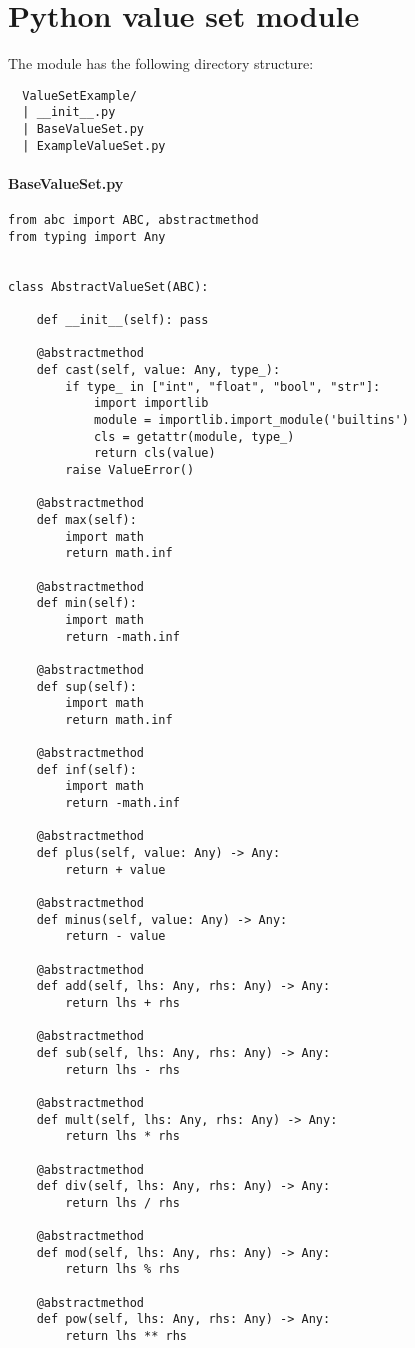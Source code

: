 \clearpage

\section{Python value set module}
\label{appendix:static-dynamic-bridge.python.vs}

The module has the following directory structure:
\begin{verbatim}
  ValueSetExample/
  | __init__.py
  | BaseValueSet.py
  | ExampleValueSet.py
\end{verbatim}

\paragraph{BaseValueSet.py}
\label{appendix:static-dynamic-bridge.python.vs.BaseValueSet.py}

\begin{verbatim}
from abc import ABC, abstractmethod
from typing import Any


class AbstractValueSet(ABC):

    def __init__(self): pass

    @abstractmethod
    def cast(self, value: Any, type_):
        if type_ in ["int", "float", "bool", "str"]:
            import importlib
            module = importlib.import_module('builtins')
            cls = getattr(module, type_)
            return cls(value)
        raise ValueError()

    @abstractmethod
    def max(self):
        import math
        return math.inf

    @abstractmethod
    def min(self):
        import math
        return -math.inf

    @abstractmethod
    def sup(self):
        import math
        return math.inf

    @abstractmethod
    def inf(self):
        import math
        return -math.inf

    @abstractmethod
    def plus(self, value: Any) -> Any:
        return + value

    @abstractmethod
    def minus(self, value: Any) -> Any:
        return - value

    @abstractmethod
    def add(self, lhs: Any, rhs: Any) -> Any:
        return lhs + rhs

    @abstractmethod
    def sub(self, lhs: Any, rhs: Any) -> Any:
        return lhs - rhs

    @abstractmethod
    def mult(self, lhs: Any, rhs: Any) -> Any:
        return lhs * rhs

    @abstractmethod
    def div(self, lhs: Any, rhs: Any) -> Any:
        return lhs / rhs

    @abstractmethod
    def mod(self, lhs: Any, rhs: Any) -> Any:
        return lhs % rhs

    @abstractmethod
    def pow(self, lhs: Any, rhs: Any) -> Any:
        return lhs ** rhs
\end{verbatim}

